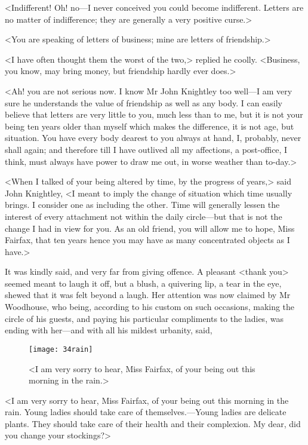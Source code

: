 <Indifferent! Oh! no—I never conceived you could become indifferent. Letters are no matter of indifference; they are generally a very positive curse.>

<You are speaking of letters of business; mine are letters of friendship.>

<I have often thought them the worst of the two,> replied he coolly. <Business, you know, may bring money, but friendship hardly ever does.>

<Ah! you are not serious now. I know Mr John Knightley too well—I am very sure he understands the value of friendship as well as any body. I can easily believe that letters are very little to you, much less than to me, but it is not your being ten years older than myself which makes the difference, it is not age, but situation. You have every body dearest to you always at hand, I, probably, never shall again; and therefore till I have outlived all my affections, a post-office, I think, must always have power to draw me out, in worse weather than to-day.>

<When I talked of your being altered by time, by the progress of years,> said John Knightley, <I meant to imply the change of situation which time usually brings. I consider one as including the other. Time will generally lessen the interest of every attachment not within the daily circle—but that is not the change I had in view for you. As an old friend, you will allow me to hope, Miss Fairfax, that ten years hence you may have as many concentrated objects as I have.>

It was kindly said, and very far from giving offence. A pleasant <thank you> seemed meant to laugh it off, but a blush, a quivering lip, a tear in the eye, shewed that it was felt beyond a laugh. Her attention was now claimed by Mr Woodhouse, who being, according to his custom on such occasions, making the circle of his guests, and paying his particular compliments to the ladies, was ending with her—and with all his mildest urbanity, said,

\begin{figure}[tbph]
\centering
\texttt{[image: 34rain]}
\caption[I am very sorry to hear of your being out in the rain]{<I am very sorry to hear, Miss Fairfax, of your being out this morning in the rain.>}
\end{figure}

<I am very sorry to hear, Miss Fairfax, of your being out this morning in the rain. Young ladies should take care of themselves.—Young ladies are delicate plants. They should take care of their health and their complexion. My dear, did you change your stockings?>

